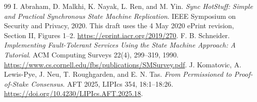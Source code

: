 \documentclass[11pt,a4paper,onecolumn]{article}
\begin{document}
\begin{thebibliography}{99}\small
\setlength{\itemsep}{3pt}
I. Abraham, D. Malkhi, K. Nayak, L. Ren, and M. Yin.
\emph{Sync HotStuff: Simple and Practical Synchronous State Machine Replication}.
IEEE Symposium on Security and Privacy, 2020.
This draft uses the 4 May 2020 ePrint revision, Section II, Figures 1--2.
\url{https://eprint.iacr.org/2019/270}.
F. B. Schneider.
\emph{Implementing Fault-Tolerant Services Using the State Machine Approach:
A Tutorial}. ACM Computing Surveys 22(4), 299--319, 1990.
\url{https://www.cs.cornell.edu/fbs/publications/SMSurvey.pdf}.
J. Komatovic, A. Lewis-Pye, J. Neu, T. Roughgarden, and E. N. Tas.
\emph{From Permissioned to Proof-of-Stake Consensus}.
AFT 2025, LIPIcs 354, 18:1--18:26.
\url{https://doi.org/10.4230/LIPIcs.AFT.2025.18}.


\end{thebibliography}
\end{document}
